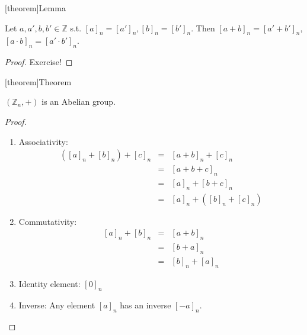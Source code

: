 \documentclass[12pt]{report}
\theoremstyle{definition}
\begin{document}
[theorem]{Lemma}
\begin{well-definied operations on Zn}
    Let $a, a', b, b' \in \mathbb{Z}$ s.t. ${[a]}_n = {[a']}_n, {[b]}_n = {[b']}_n$.
    Then ${[a + b]}_n = {[a' + b']}_n$, ${[a\cdot b]}_n = {[a' \cdot b']}_n$.
\end{well-definied operations on Zn}

\begin{proof}
    Exercise!
\end{proof}

[theorem]{Theorem}
\begin{Zn is Abelian}
    $(\mathbb{Z}_n, +)$ is an Abelian group.
\end{Zn is Abelian}

\begin{proof}
    \;

    \begin{enumerate}[label = (\arabic*)]
        \item Associativity: 
            \begin{eqnarray*}
                ({[a]}_{n} + {[b]}_{n}) + {[c]}_{n}
                &=& {[a + b]}_{n} + {[c]}_{n} \\
                &=& {[a + b + c]}_{n} \\
                &=& {[a]}_{n} + {[b + c]}_{n} \\
                &=& {[a]}_{n} + ({[b]}_{n} + {[c]}_{n})
            \end{eqnarray*}
            
        \item Commutativity:
            \begin{eqnarray*}
                {[a]}_{n} + {[b]}_{n}
                &=& {[a + b]}_{n} \\
                &=& {[b + a]}_{n} \\
                &=& {[b]}_{n} + {[a]}_{n}
            \end{eqnarray*}

        \item Identity element: ${[0]}_{n}$
        \item Inverse: Any element ${[a]}_{n}$ has an inverse ${[-a]}_{n}$.
            
    \end{enumerate}
    
\end{proof}
\end{document}
